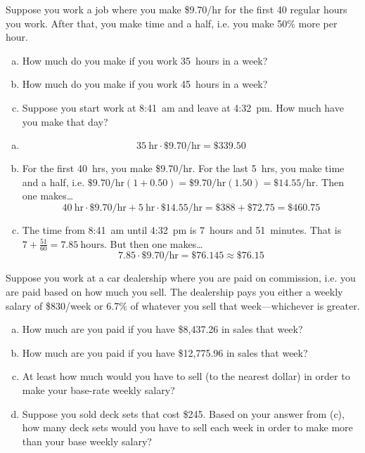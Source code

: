 \documentclass[11pt,letterpaper]{article}
\begin{document}
\newpage





 Suppose you work a job where you make \$9.70/hr for the first 40 regular hours you work. After that, you make time and a half, i.e. you make 50\% more per hour. 
\begin{enumerate}[(a)]
\item How much do you make if you work 35~hours in a week?
\item How much do you make if you work 45~hours in a week?
\item Suppose you start work at 8:41~am and leave at 4:32~pm. How much have you make that day?
\end{enumerate} \pspace

\sol
{\itshape
\begin{enumerate}[(a)]
\item 
	\[
	35~\text{hr} \cdot \$9.70\text{/hr}= \$339.50
	\] \pspace

\item For the first 40~hrs, you make \$9.70/hr. For the last 5~hrs, you make time and a half, i.e. $\$9.70\text{/hr}(1 + 0.50)= \$9.70\text{/hr}(1.50)= \$14.55\text{/hr}$. Then one makes\dots
	\[
	40~\text{hr} \cdot \$9.70\text{/hr} + 5~\text{hr} \cdot \$14.55\text{/hr}= \$388 + \$72.75= \$460.75
	\] \pspace

\item The time from 8:41~am until 4:32~pm is 7~hours and 51~minutes. That is $7 + \frac{51}{60}= 7.85~\text{hours}$. But then one makes\dots
	\[
	7.85 \cdot \$9.70\text{/hr}= \$76.145 \approx \$76.15
	\]
\end{enumerate}
}





\newpage





 Suppose you work at a car dealership where you are paid on commission, i.e. you are paid based on how much you sell. The dealership pays you either a weekly salary of \$830/week or 6.7\% of whatever you sell that week---whichever is greater.
\begin{enumerate}[(a)]
\item How much are you paid if you have \$8,437.26 in sales that week?
\item How much are you paid if you have \$12,775.96 in sales that week?
\item At least how much would you have to sell (to the nearest dollar) in order to make your base-rate weekly salary?
\item Suppose you sold deck sets that cost \$245. Based on your answer from (c), how many deck sets would you have to sell each week in order to make more than your base weekly salary? 
\end{enumerate} \pspace
\end{document}
